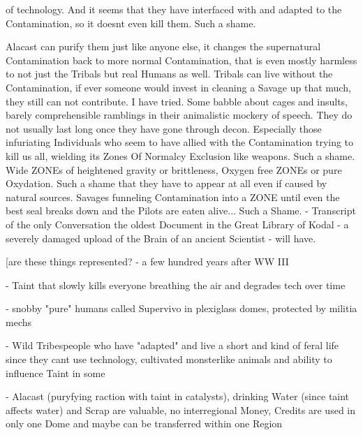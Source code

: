 \documentclass{article}
\begin{document}
    of technology. And it seems that they have interfaced with and adapted to the Contamination, so it doesnt even kill
    them. Such a shame. \par
    Alacast can purify them just like anyone else, it changes the supernatural Contamination back to more normal
    Contamination, that is even mostly harmless to not just the Tribals but real Humans as well. Tribals can live without
    the Contamination, if ever someone would invest in cleaning a Savage up that much, they still can not contribute.
    I have tried. Some babble about cages and insults, barely comprehensible ramblings in their animalistic mockery of
    speech. They do not usually last long once they have gone through decon. Especially those infuriating Individuals
    who seem to have allied with the Contamination trying to kill us all, wielding its Zones Of Normalcy Exclusion like
    weapons. Such a shame. Wide ZONEs of heightened gravity or brittleness, Oxygen free ZONEs or pure Oxydation. Such a
    shame that they have to appear at all even if caused by natural sources. Savages funneling Contamination into a ZONE
    until even the best seal breaks down and the Pilots are eaten alive... Such a Shame.\newline
    \newline
    - Transcript of the only Conversation the oldest Document in the Great Library of Kodal - a severely damaged
    upload of the Brain of an ancient Scientist - will have.\newpage

    [are these things represented?
    - a few hundred years after WW III\par

    - Taint that slowly kills everyone breathing the air and degrades tech over time\par

    - snobby "pure" humans called Supervivo in plexiglass domes, protected by militia mechs\par

    - Wild Tribespeople who have "adapted" and live a short and kind of feral life since they cant use technology, cultivated monsterlike animals and ability to influence Taint in some\par

    - Alacast (puryfying raction with taint in catalysts), drinking Water (since taint affects water) and Scrap are valuable, no interregional Money, Credits are used in only one Dome and maybe can be transferred within one Region\par
\end{document}

